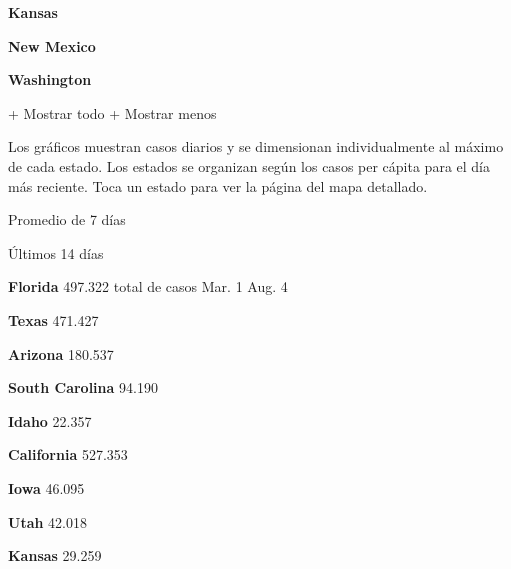\textbf{Kansas}

\href{https://www.nytimes.com/interactive/2020/us/new-mexico-coronavirus-cases.html}{}

\textbf{New Mexico}

\href{https://www.nytimes.com/interactive/2020/us/washington-coronavirus-cases.html}{}

\textbf{Washington}

+ Mostrar todo + Mostrar menos

Los gráficos muestran casos diarios y se dimensionan individualmente al
máximo de cada estado. Los estados se organizan según los casos per
cápita para el día más reciente. Toca un estado para ver la página del
mapa detallado.

\href{https://www.nytimes.com/interactive/2020/us/florida-coronavirus-cases.html}{}

Promedio de 7 días

Últimos 14 días

\textbf{Florida} 497.322 total de casos Mar. 1 Aug. 4

\href{https://www.nytimes.com/interactive/2020/us/texas-coronavirus-cases.html}{}

\textbf{Texas} 471.427

\href{https://www.nytimes.com/interactive/2020/us/arizona-coronavirus-cases.html}{}

\textbf{Arizona} 180.537

\href{https://www.nytimes.com/interactive/2020/us/south-carolina-coronavirus-cases.html}{}

\textbf{South Carolina} 94.190

\href{https://www.nytimes.com/interactive/2020/us/idaho-coronavirus-cases.html}{}

\textbf{Idaho} 22.357

\href{https://www.nytimes.com/interactive/2020/us/california-coronavirus-cases.html}{}

\textbf{California} 527.353

\href{https://www.nytimes.com/interactive/2020/us/iowa-coronavirus-cases.html}{}

\textbf{Iowa} 46.095

\href{https://www.nytimes.com/interactive/2020/us/utah-coronavirus-cases.html}{}

\textbf{Utah} 42.018

\href{https://www.nytimes.com/interactive/2020/us/kansas-coronavirus-cases.html}{}

\textbf{Kansas} 29.259

